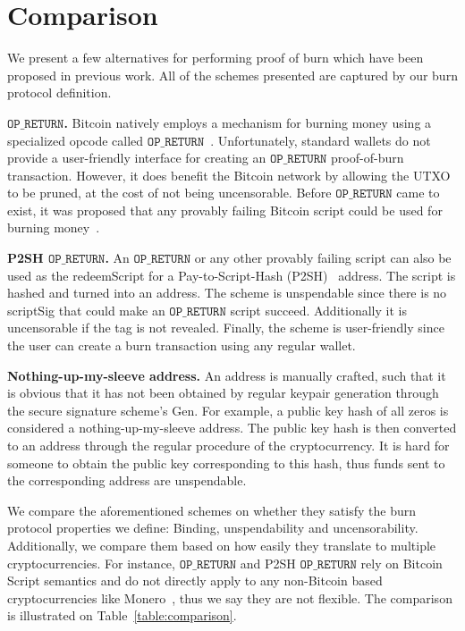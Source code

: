 \section{Comparison}

We present a few alternatives for performing proof of burn which have been proposed in previous work. All of the schemes presented are captured by our burn protocol definition.

\newcommand{\opreturn}{\texttt{OP\_RETURN}}

\noindent
\textbf{$\opreturn$.}
Bitcoin natively employs a mechanism for burning money using a specialized
opcode called $\opreturn$~\cite{bartoletti2017analysis}. Unfortunately,
standard wallets do not provide a user-friendly interface for creating an $\opreturn$ proof-of-burn transaction.
However, it does benefit the Bitcoin network by allowing the UTXO
to be pruned, at the cost of not being uncensorable.
Before $\opreturn$ came to exist, it was proposed that any provably failing Bitcoin script could be used for burning money~\cite{stewart}.

\noindent
\textbf{P2SH $\opreturn$.}
An $\opreturn$ or any other provably failing script can also be used as the redeemScript for a Pay-to-Script-Hash (P2SH)~\cite{p2sh} address. The script is hashed and turned into an address. The scheme is unspendable since there is no scriptSig that could make an $\opreturn$ script succeed. Additionally it is uncensorable if the tag is not revealed. Finally, the scheme is user-friendly since the user can create a burn transaction using any regular wallet.

\noindent
\textbf{Nothing-up-my-sleeve address.}
An address is manually crafted, such that it is obvious that it has not been obtained by regular keypair generation through the secure signature scheme's \textsf{Gen}. For example, a public key hash of all zeros is considered a nothing-up-my-sleeve address. The public key hash is then converted to an address through the regular procedure of the cryptocurrency. It is hard for someone to obtain the public key corresponding to this hash, thus funds sent to the corresponding address are unspendable.

We compare the aforementioned schemes on whether they satisfy the burn protocol properties we define: Binding, unspendability and uncensorability. Additionally, we compare them based on how easily they translate to multiple cryptocurrencies. For instance, $\opreturn$ and P2SH $\opreturn$ rely on Bitcoin Script semantics and do not directly apply to any non-Bitcoin based cryptocurrencies like Monero~\cite{van2013cryptonote}, thus we say they are not flexible. The comparison is illustrated on Table~\ref{table:comparison}.

